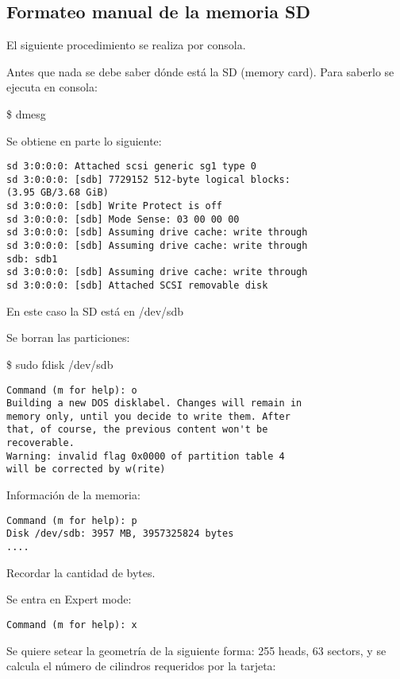 \subsection{Formateo manual de la memoria SD}

El siguiente procedimiento se realiza por consola.

\bigskip
Antes que nada se debe saber dónde está la SD (memory card).
Para saberlo se ejecuta en consola: 

\centerline{\$ dmesg}

\bigskip
Se obtiene en parte lo siguiente: 
\begin{verbatim}
sd 3:0:0:0: Attached scsi generic sg1 type 0 
sd 3:0:0:0: [sdb] 7729152 512-byte logical blocks: 
(3.95 GB/3.68 GiB) 
sd 3:0:0:0: [sdb] Write Protect is off 
sd 3:0:0:0: [sdb] Mode Sense: 03 00 00 00 
sd 3:0:0:0: [sdb] Assuming drive cache: write through 
sd 3:0:0:0: [sdb] Assuming drive cache: write through 
sdb: sdb1 
sd 3:0:0:0: [sdb] Assuming drive cache: write through 
sd 3:0:0:0: [sdb] Attached SCSI removable disk 
\end{verbatim}

En este caso la SD está en /dev/sdb 

\bigskip
Se borran las particiones: 

\centerline{\$ sudo fdisk /dev/sdb}

\bigskip
\begin{verbatim}
Command (m for help): o 
Building a new DOS disklabel. Changes will remain in 
memory only, until you decide to write them. After 
that, of course, the previous content won't be 
recoverable. 
Warning: invalid flag 0x0000 of partition table 4 
will be corrected by w(rite) 
\end{verbatim}

Información de la memoria: 

\begin{verbatim}
Command (m for help): p 
Disk /dev/sdb: 3957 MB, 3957325824 bytes 
.... 
\end{verbatim}

Recordar la cantidad de bytes.

\bigskip
Se entra en Expert mode: 

\bigskip
\begin{verbatim}
Command (m for help): x 
\end{verbatim}

Se quiere setear la geometría de la siguiente forma: 255 heads, 63 sectors, y se calcula el 
número de cilindros requeridos por la tarjeta: 

